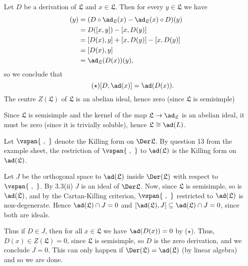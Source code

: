 Let $D$ be a derivation of $\mathfrak{L}$ and $x \in \mathfrak{L}$. Then
for every $y \in \mathfrak{L}$ we have
\begin{align*}
	[D, \ad_{\mathfrak{L}}(x)](y) &= (D \circ \ad_{\mathfrak{L}}(x) - \ad_{\mathfrak{L}}(x) \circ D)(y)\\
	&= D([x, y]) - [x, D(y)]\\
	&= [D(x), y] + [x, D(y)] - [x, D(y)]\\
	&= [D(x), y]\\
	&= \ad_{\mathfrak{L}}(D(x))(y),
\end{align*}
so we conclude that
\begin{equation}\tag{$\star$}
[D, \ad(x)] = \ad(D(x)).
\end{equation}
The centre $Z(\mathfrak{L})$ of $\mathfrak{L}$ is an abelian ideal, hence zero
(since $\mathfrak{L}$ is semisimple)

Since $\mathfrak{L}$ is semisimple
and the kernel of the map $\mathfrak{L} \to \ad_{\mathfrak{L}}$ is an abelian ideal,
it must be zero (since it is trivially soluble), hence
$\mathfrak{L}\cong \ad(L)$.

Let $\vspan{\ ,\ }$ denote the Killing form on $\Der \mathfrak{L}$. By question
13 from the example sheet, the restriction of $\vspan{\ ,\ }$ to $\ad(\mathfrak{L})$
is the Killing form on $\ad(\mathfrak{L})$.

Let $J$ be the orthogonal space to $\ad(\mathfrak{L})$ inside $\Der(\mathfrak{L})$
with respect to $\vspan{\ ,\ }$. By 3.3(ii) $J$ is an ideal of $\Der \mathfrak{L}$.
Now, since $\mathfrak{L}$ is semisimple, so is $\ad(\mathfrak{L})$, and by the
Cartan-Killing criterion,  $\vspan{\ ,\ }$ restricted to $\ad(\mathfrak{L})$ is
non-degenerate. Hence $\ad(\mathfrak{L})\cap J = 0$ and
$[\ad(\mathfrak{L}), J] \subseteq \ad(\mathfrak{L})\cap J = 0$,
since both are ideals.

Thus if $D \in J$, then for all $x \in \mathfrak{L}$ we have $\ad(D(x)) = 0$ by
($\star$). Thus, $D(x) \in Z(\mathfrak{L}) = 0$, since $\mathfrak{L}$ is semisimple,
so $D$ is the zero derivation, and we conclude $J = 0$. This can only happen
if $\Der(\mathfrak{L}) = \ad(\mathfrak{L})$ (by linear algebra) and so we are done.
